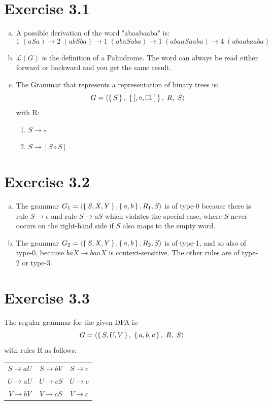 \documentclass{article} %
\newcommand{\homeworkNumber}{3}
\begin{document}
\section*{Exercise \homeworkNumber.1}
\begin{enumerate}[(a)]
	\item
	A possible derivation of the word "abaabaaba" is:
	$$
	1 \; (aSa) \to 2 \; (abSba) \to 1 \; (abaSaba) \to 1 \; (abaaSaaba) \to 4 \; (abaabaaba)
	$$
	
	\item
	$\mathcal{L}(G)$ is the definition of a Palindrome. The word can always be read either forward or
	backward and you get the same result.
	
	\item
	The Grammar that represents a representation of binary trees is:
	$$
	G = \left \langle \set{S}, \; \set{[, \circ, \square, ]}, \; R, \; S \right \rangle
	$$
	with R:
	\begin{enumerate}[1)]
		\item
		$S \to \square$
		
		\item
		$S \to [S \circ S]$
		
	\end{enumerate}
	
\end{enumerate}

\section*{Exercise \homeworkNumber.2}
\begin{enumerate}[(a)]
	\item
	The grammar $G_1 = \left \langle \set{S, X, Y}, \set{a, b}, R_1, S \right \rangle$ is of type-0
	because there is rule $S \to \epsilon$ and rule $S \to aS$ which violates the special case, where $S$
	never occurs on the right-hand side if $S$ also maps to the empty word.

	\item
	The grammar $G_2 = \left \langle \set{S, X, Y}, \set{a, b}, R_2, S \right \rangle$ is of type-1, and
	so also of type-0, because $baX \to baaX$ is context-sensitive. The other rules are of type-2 or
	type-3.

\end{enumerate}

\section*{Exercise \homeworkNumber.3}
The regular grammar for the given DFA is:
$$
G = \left \langle \set{S, U, V}, \; \set{a, b, c}, \; R, \; S \right \rangle
$$
with rules R as follows:
\begin{center}
	\begin{tabular}{ c c c }
 	$S \to aU$ & $S \to bV$ & $S \to c$ \\ 
 	$U \to aU$ & $U \to cS$ & $U \to c$ \\  
 	$V \to bV$ & $V \to cS$ & $V \to c$    
	\end{tabular}
\end{center}
\end{document}
